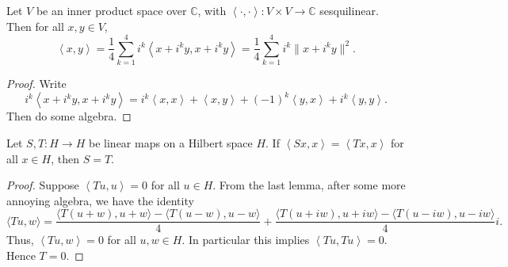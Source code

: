 \begin{lemma}
	\label{lem:Polarization}
	Let $V$ be an inner product space over $\mathbb{C}$, with $\left\langle \cdot , \cdot  \right\rangle : V \times V \to \mathbb{C}$ sesquilinear. Then for all $x, y \in V$,
	\[
		\left\langle x, y \right\rangle 
		= \frac{1}{4} \sum_{k = 1}^4 i^k \left\langle x + i^k y, x + i^k y \right\rangle 
		= \frac{1}{4} \sum_{k = 1}^4 i^k \|x + i^k y\|^2
	.\] 
\end{lemma}
\begin{proof}
	Write
	\[
		i^k \left\langle x + i^k y, x + i^k y \right\rangle 
		= i^k \left\langle x, x \right\rangle 
		+ \left\langle x, y \right\rangle 
		+ (-1)^k \left\langle y, x \right\rangle 
		+ i^k \left\langle y, y \right\rangle 
	.\] 
	Then do some algebra.
\end{proof}

\begin{corollary}
	\label{cor:Polarization}
	Let $S, T: H \to H$ be linear maps on a Hilbert space $H$. If $\left\langle Sx, x \right\rangle  = \left\langle T x, x \right\rangle $ for all $x \in H$, then $S = T$.
\end{corollary}
\begin{proof}
	Suppose $\left\langle Tu, u \right\rangle = 0$ for all $u \in H$. From the last lemma, after some more annoying algebra, we have the identity
	\[
		\langle T u, w\rangle=\frac{\langle T(u+w), u+w\rangle-\langle T(u-w), u-w\rangle}{4}+\frac{\langle T(u+i w), u+i w\rangle-\langle T(u-i w), u-i w\rangle}{4} i
	.\]
	Thus, $\left\langle Tu, w \right\rangle = 0$ for all $u, w \in H$. In particular this implies $\left\langle Tu, Tu \right\rangle  = 0$. Hence $T = 0$.

\end{proof}

